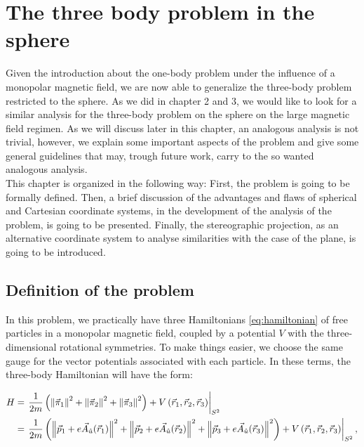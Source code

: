 \chapter{The three body problem in the sphere}
Given the introduction about the one-body problem under the influence of a monopolar magnetic field, we are now able to generalize the three-body problem restricted to the sphere. As we did in chapter 2 and 3, we would like to look for a similar analysis for the three-body problem on the sphere on the large magnetic field regimen. As we will discuss later in this chapter, an analogous analysis is not trivial, however, we explain some important aspects of the problem and give some general guidelines that may, trough future work, carry to the so wanted analogous analysis.\\

This chapter is organized in the following way: First, the problem is going to be formally defined. Then, a brief discussion of the advantages and flaws of spherical and Cartesian coordinate systems, in the development of the analysis of the problem, is going to be presented. Finally, the stereographic projection, as an alternative coordinate system to analyse similarities with the case of the plane, is going to be introduced.\\

\section{Definition of the problem}
In this problem, we practically have three Hamiltonians \eqref{eq:hamiltonian} of free particles in a monopolar magnetic field, coupled by a potential $V$ with the three-dimensional rotational symmetries. To make things easier, we choose the same gauge for the vector potentials associated with each particle. In these terms, the three-body Hamiltonian will have the form:

\begin{align}
H &= \left. \frac{1}{2m}\left( \left\lVert \vec{\pi}_1 \right\rVert^2+\left\lVert \vec{\pi}_2 \right\rVert^2+\left\lVert \vec{\pi}_3 \right\rVert^2 \right) + V\left( \vec{r}_1,\vec{r}_2,\vec{r}_3 \right)    \right|_{S^2} \nonumber \\
&= \left. \frac{1}{2m}\left( \left\lVert \vec{p}_1+e\vec{A}_{\hat{u}}(\vec{r}_1) \right\rVert^2+\left\lVert \vec{p}_2+e\vec{A}_{\hat{u}}(\vec{r}_2) \right\rVert^2+\left\lVert \vec{p}_3+e\vec{A}_{\hat{u}}(\vec{r}_3) \right\rVert^2 \right) + V\left( \vec{r}_1,\vec{r}_2,\vec{r}_3 \right)    \right|_{S^2},
\label{eq:3sphereHam}
\end{align}

